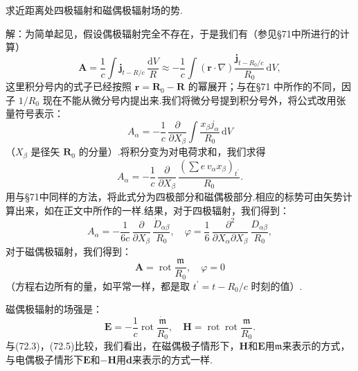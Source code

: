 \begin{xiti}

\quad 求近距离处四极辐射和磁偶极辐射场的势.

解：为简单起见，假设偶极辐射完全不存在，于是我们有（参见§71中所进行的计算）
\begin{equation*}
  \boldsymbol{A}=\frac{1}{c}\int\boldsymbol{j}_{t-R/c}\,\frac{\mathrm{d}V}{R}
  \approx-\frac{1}{c}\int(\boldsymbol{r}\cdot\nabla)\frac{\boldsymbol{j}_{t-R_0/c}}{R_0}\,\mathrm{d}V,
\end{equation*}
这里积分号内的式子已经按照 $\boldsymbol{r}=\boldsymbol{R}_0-\boldsymbol{R}$ 的幂展开；与在§71 中所作的不同，因子 $1/R_0$ 现在不能从微分号内提出来.我们将微分号提到积分号外，将公式改用张量符号表示：
\begin{equation*}
  A_\alpha=-\frac{1}{c}\,\frac{\partial}{\partial X_\beta}\int\frac{x_\beta j_\alpha}{R_0}\,\mathrm{d}V
\end{equation*}
（$X_\beta$ 是径矢 $\boldsymbol{R}_0$ 的分量）.将积分变为对电荷求和，我们求得
\begin{equation*}
  A_\alpha=-\frac{1}{c}\,\frac{\partial}{\partial X_\beta}\,\frac{(\sum e\,v_\alpha x_\beta)_{t^{\prime}}}{R_0}.
\end{equation*}
用与§71中同样的方法，将此式分为四极部分和磁偶极部分.相应的标势可由矢势计算出来，如在正文中所作的一样.结果，对于四极辐射，我们得到：
\begin{equation*}
  A_\alpha=-\frac{1}{6c}\,\frac{\partial}{\partial X_\beta}\,\frac{\dot{D}_{\alpha\beta}}{R_0},\quad
  \varphi=\frac{1}{6}\,\frac{\partial^2}{\partial X_\alpha\partial X_\beta}\,\frac{D_{\alpha\beta}}{R_0},
\end{equation*}
对于磁偶极辐射，我们得到：
\begin{equation*}
  \boldsymbol{A}=\operatorname{rot}\frac{\mathfrak{m}}{R_0},\quad
  \varphi=0
\end{equation*}
（方程右边所有的量，如平常一样，都是取 $t^{\prime}=t-R_0/c$ 时刻的值）.

磁偶极辐射的场强是：
\begin{equation*}
  \boldsymbol{E}=-\frac{1}{c}\operatorname{rot}\frac{\dot{\mathfrak{m}}}{R_0},\quad
  \boldsymbol{H}=\operatorname{rot}\operatorname{rot}\frac{\mathfrak{m}}{R_0}.
\end{equation*}
与(72.3)，(72.5)比较，我们看出，在磁偶极子情形下，$\boldsymbol{H}$和$\boldsymbol{E}$用$\mathfrak{m}$来表示的方式，与电偶极子情形下$\boldsymbol{E}$和$-\boldsymbol{H}$用$\boldsymbol{d}$来表示的方式一样.


\end{xiti}
